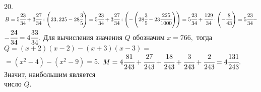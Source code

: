 20. $B=5\cfrac{23}{34}+3\cfrac{27}{34}:\left(23,225-28\cfrac{3}{5}\right)=5\cfrac{23}{34}+3\cfrac{27}{34}:\left(-\left(28\cfrac{3}{5}-23\cfrac{225}{1000}\right)\right)=
5\cfrac{23}{34}+\cfrac{129}{34}\cdot\left(-\cfrac{8}{43}\right)=5\cfrac{23}{34}-$\\$-\cfrac{24}{34}=4\cfrac{33}{34}.$ Для вычисления значения $Q$ обозначим $x=766,$ тогда $Q=(x+2)(x-2)-(x+3)(x-3)=$\\$=(x^2-4)-(x^2-9)=5.$ $M=4\cfrac{81}{243}+\cfrac{27}{243}+\cfrac{18}{243}+\cfrac{3}{243}+\cfrac{2}{243}=4\cfrac{131}{243}.$
Значит, наибольшим является\\ число $Q.$\\

